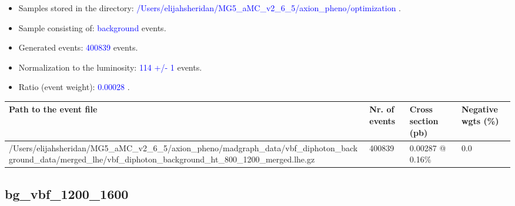 \documentclass[a4paper, 10pt]{article}
\begin{document}
\begin{itemize}
  \item Samples stored in the directory: \textcolor{blue}{/\-Users/\-elijahsheridan/\-MG5\_aMC\_v2\_6\_5/\-axion\_pheno/\-optimization} .
   \item Sample consisting of: \textcolor{blue}{background}  events.
   \item Generated events: \textcolor{blue}{400839 }  events.
   \item Normalization to the luminosity: \textcolor{blue}{114}\textcolor{blue}{ +/\-- }\textcolor{blue}{1 }  events.
   \item Ratio (event weight): \textcolor{blue}{0.00028 } .  
 
\end{itemize}
\begin{table}[H]
  \begin{center}
    \begin{tabular}{|m{55.0mm}|m{25.0mm}|m{30.0mm}|m{30.0mm}|}
      \hline
      {\cellcolor{yellow}         Path to the event file}& {\cellcolor{yellow}         Nr. of events}& {\cellcolor{yellow}         Cross section (pb)}& {\cellcolor{yellow}         Negative wgts (\%)}\\
      \hline
      {\cellcolor{white}          /\-Users/\-elijahsheridan/\-MG5\_aMC\_v2\_6\_5/\-axion\_pheno/\-madgraph\_data/\-vbf\_diphoton\_background\_data/\-merged\_lhe/\-vbf\_diphoton\_background\_ht\_800\_1200\_merged.lhe.gz}& {\cellcolor{white}          400839}& {\cellcolor{white}          0.00287 @ 0.16\%}& {\cellcolor{white}          0.0}\\
\hline
    \end{tabular}
  \end{center}
\end{table}

\subsection{ bg\_vbf\_1200\_1600}
\end{document}
